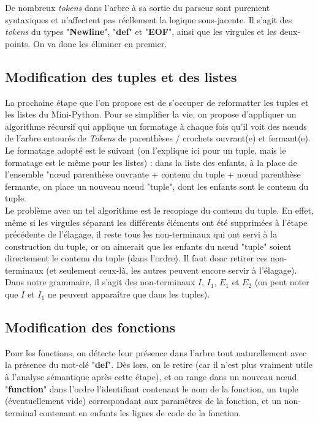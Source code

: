 \documentclass[a4paper, 12pt]{report}
\begin{document}
De nombreux \textit{tokens} dans l'arbre à sa sortie du parseur sont purement syntaxiques et n'affectent pas réellement la logique sous-jacente. Il s'agit des \textit{tokens} du types "\textbf{Newline}", "\textbf{def}" et "\textbf{EOF}", ainsi que les virgules et les deux-points. On va donc les éliminer en premier.\\

\subsection{Modification des tuples et des listes}

La prochaine étape que l'on propose est de s'occuper de reformatter les tuples et les listes du Mini-Python. Pour se simplifier la vie, on propose d'appliquer un algorithme récursif qui applique un formatage à chaque fois qu'il voit des n{\oe}uds de l'arbre entourés de \textit{Tokens} de parenthèses / crochets ouvrant(e) et fermant(e).\\

Le formatage adopté est le suivant (on l'explique ici pour un tuple, mais le formatage est le même pour les listes) : dans la liste des enfants, à la place de l'ensemble "n{\oe}ud parenthèse ouvrante + contenu du tuple + n{\oe}ud parenthèse fermante, on place un nouveau n{\oe}ud "tuple", dont les enfants sont le contenu du tuple.\\

Le problème avec un tel algorithme est le recopiage du contenu du tuple. En effet, même si les virgules séparant les différents éléments ont été supprimées à l'étape précédente de l'élagage, il reste tous les non-terminaux qui ont servi à la construction du tuple, or on aimerait que les enfants du n{\oe}ud "tuple" soient directement le contenu du tuple (dans l'ordre). Il faut donc retirer ces non-terminaux (et seulement ceux-là, les autres peuvent encore servir à l'élagage). Dans notre grammaire, il s'agit des non-terminaux $I$, $I_1$, $E_1$ et $E_2$ (on peut noter que $I$ et $I_1$ ne peuvent apparaître que dans les tuples).\\

\subsection{Modification des fonctions}

Pour les fonctions, on détecte leur présence dans l'arbre tout naturellement avec la présence du mot-clé "\textbf{def}". Dès lors, on le retire (car il n'est plus vraiment utile à l'analyse sémantique après cette étape), et on range dans un nouveau n{\oe}ud "\textbf{function}" dans l'ordre l'identifiant contenant le nom de la fonction, un tuple (éventuellement vide) correspondant aux paramètres de la fonction, et un non-terminal contenant en enfants les lignes de code de la fonction.\\
\end{document}
